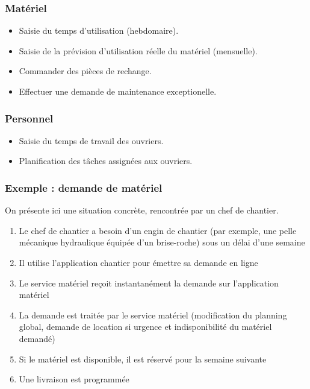 \subsubsection{Matériel}
\begin{itemize}
\item Saisie du temps d'utilisation (hebdomaire).
\item Saisie de la prévision d'utilisation réelle du matériel (mensuelle).
\item Commander des pièces de rechange.
\item Effectuer une demande de maintenance exceptionelle.
\end{itemize}

\subsubsection{Personnel}
\begin{itemize}
\item Saisie du temps de travail des ouvriers.
\item Planification des tâches assignées aux ouvriers.
\end{itemize}

\subsubsection{Exemple : demande de matériel}
On présente ici une situation concrète, rencontrée par un chef de chantier.

\begin{enumerate}
\item Le chef de chantier a besoin d'un engin de chantier (par exemple, une
pelle mécanique hydraulique équipée d'un brise-roche) sous un délai d'une
semaine
\item Il utilise l'application chantier pour émettre sa demande en ligne
\item Le service matériel reçoit instantanément la demande sur
l’application matériel
\item La demande est traitée par le service matériel (modification du
planning global, demande de location si urgence et indisponibilité du
matériel demandé)
\item Si le matériel est disponible, il est réservé pour la semaine
suivante
\item Une livraison est programmée
\end{enumerate}
